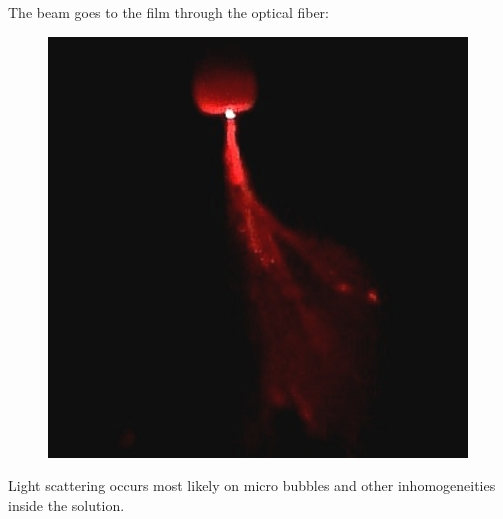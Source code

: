 The beam goes to the film through the optical fiber:

\phantom{42}

\begin{minipage}{0.45\textwidth}
    \begin{center}
    \end{center}
\end{minipage}
\hfill
\begin{minipage}{0.45\textwidth}
    \begin{figure}[h]
        \centering
        \includegraphics[width=0.99\textwidth]{figures/photo3.jpg}
    \end{figure}
\end{minipage}

\phantom{42}

Light scattering occurs most likely on micro bubbles and other inhomogeneities inside the solution.